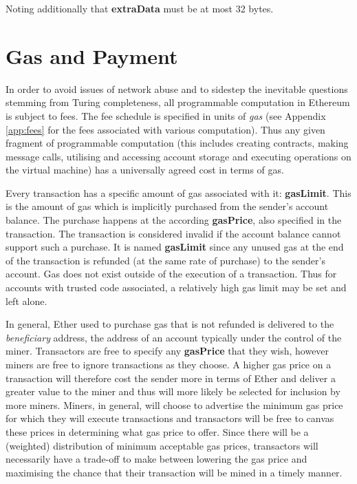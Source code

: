 \documentclass[9pt,oneside]{amsart}
\begin{document}
\begin{multicols}{2}
Noting additionally that \textbf{extraData} must be at most 32 bytes.

\section{Gas and Payment} \label{ch:payment}

In order to avoid issues of network abuse and to sidestep the inevitable questions stemming from Turing completeness, all programmable computation in Ethereum is subject to fees. The fee schedule is specified in units of \textit{gas} (see Appendix \ref{app:fees} for the fees associated with various computation). Thus any given fragment of programmable computation (this includes creating contracts, making message calls, utilising and accessing account storage and executing operations on the virtual machine) has a universally agreed cost in terms of gas.

Every transaction has a specific amount of gas associated with it: \textbf{gasLimit}. This is the amount of gas which is implicitly purchased from the sender's account balance. The purchase happens at the according \textbf{gasPrice}, also specified in the transaction. The transaction is considered invalid if the account balance cannot support such a purchase. It is named \textbf{gasLimit} since any unused gas at the end of the transaction is refunded (at the same rate of purchase) to the sender's account. Gas does not exist outside of the execution of a transaction. Thus for accounts with trusted code associated, a relatively high gas limit may be set and left alone.

In general, Ether used to purchase gas that is not refunded is delivered to the \textit{beneficiary} address, the address of an account typically under the control of the miner. Transactors are free to specify any \textbf{gasPrice} that they wish, however miners are free to ignore transactions as they choose. A higher gas price on a transaction will therefore cost the sender more in terms of Ether and deliver a greater value to the miner and thus will more likely be selected for inclusion by more miners. Miners, in general, will choose to advertise the minimum gas price for which they will execute transactions and transactors will be free to canvas these prices in determining what gas price to offer. Since there will be a (weighted) distribution of minimum acceptable gas prices, transactors will necessarily have a trade-off to make between lowering the gas price and maximising the chance that their transaction will be mined in a timely manner.


\end{multicols}
\end{document}
